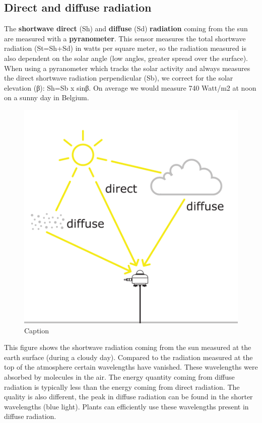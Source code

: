 \documentclass[oneside]{book}
\begin{document}
\subsection{Direct and diffuse
radiation}\label{direct-and-diffuse-radiation}

The \textbf{shortwave direct} (Sh) and \textbf{diffuse} (Sd)
\textbf{radiation} coming from the sun are measured with a
\textbf{pyranometer}. This sensor measures the total shortwave radiation
(St=Sh+Sd) in watts per square meter, so the radiation measured is also
dependent on the solar angle (low angles, greater spread over the
surface). When using a pyranometer which tracks the solar activity and
always measures the direct shortwave radiation perpendicular (Sb), we
correct for the solar elevation (β): Sh=Sb x sinβ. On average we would
measure 740 Watt/m2 at noon on a sunny day in Belgium.

\begin{figure}

{\centering \includegraphics[width=0.5\linewidth]{figures/Figure127} 

}

\caption{Caption}\label{fig:Diffuse}
\end{figure}

This figure shows the shortwave radiation coming from the sun measured
at the earth surface (during a cloudy day). Compared to the radiation
measured at the top of the atmosphere certain wavelengths have vanished.
These wavelengths were absorbed by molecules in the air. The energy
quantity coming from diffuse radiation is typically less than the energy
coming from direct radiation. The quality is also different, the peak in
diffuse radiation can be found in the shorter wavelengths (blue light).
Plants can efficiently use these wavelengths present in diffuse
radiation.
\end{document}
